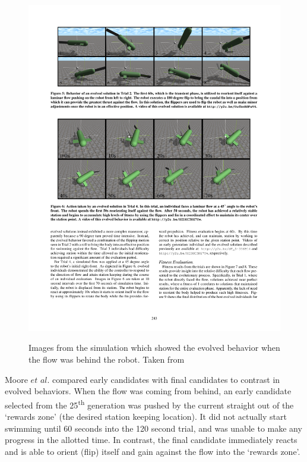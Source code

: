 \documentclass{sig-alternate}
\begin{document}
\begin{figure}%
\center
\caption{Images from the simulation which showed the evolved behavior when the flow was behind the robot. Taken from \cite{Moore:2013:ESK:2463372.2463402}}

  \includegraphics[scale=.8]{sr1}
\label{fig:robot flip}
\end{figure}

  Moore $et$ $al.$ compared early candidates with final candidates to contrast in evolved behaviors. When the flow was coming from behind, an early candidate selected from the 25\textsuperscript{th} generation was pushed by the current straight out of the `rewards zone' (the desired station keeping location). It did not actually start swimming until 60 seconds into the 120 second trial, and was unable to make any progress in the allotted time. In contrast, the final candidate immediately reacts and is able to orient (flip) itself and gain against the flow into the `rewards zone'. 
\end{document}
